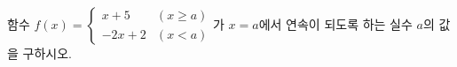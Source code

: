 함수 $f(x)=\begin{cases} x+5 & (x\ge a) \\ -2x+2 & (x<a) \end{cases}$가 $x=a$에서 연속이 되도록 하는 실수 $a$의 값을 구하시오.
